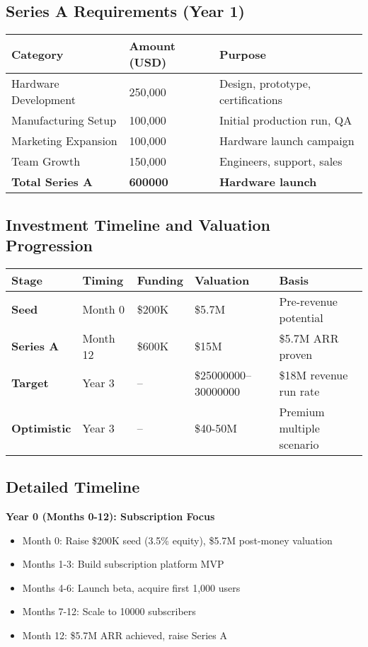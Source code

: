 \documentclass[11pt]{article}
\newcommand{\newSubsYearOne}{10000}
\newcommand{\seriesAAmount}{600000}
\newcommand{\seedEquity}{3.5}
\newcommand{\valuationRangeLow}{25000000}
\newcommand{\valuationRangeHigh}{30000000}
\begin{document}
\subsection{Series A Requirements (Year 1)}
\begin{table}[H]
\centering
\begin{tabularx}{\linewidth}{l Y Y}
\toprule
Category & Amount (USD) & Purpose \\\midrule
Hardware Development\cite{ycombinator2022} & 250,000 & Design, prototype, certifications \\
Manufacturing Setup & 100,000 & Initial production run, QA \\
Marketing Expansion & 100,000 & Hardware launch campaign \\
Team Growth & 150,000 & Engineers, support, sales \\
\textbf{Total Series A} & \textbf{\seriesAAmount} & \textbf{Hardware launch} \\
\bottomrule
\end{tabularx}
\end{table}

\subsection{Investment Timeline and Valuation Progression}
\begin{table}[H]
\centering
\begin{tabularx}{\linewidth}{l Y Y Y Y}
\toprule
Stage & Timing & Funding & Valuation & Basis \\\midrule
\textbf{Seed} & Month 0 & \$200K & \$5.7M & Pre-revenue potential \\
\textbf{Series A} & Month 12 & \$600K & \$15M & \$5.7M ARR proven \\
\textbf{Target} & Year 3 & -- & \$\num{\valuationRangeLow}--\num{\valuationRangeHigh} & \$18M revenue run rate \\
\textbf{Optimistic} & Year 3 & -- & \$40-50M & Premium multiple scenario \\
\bottomrule
\end{tabularx}
\end{table}

\subsection{Detailed Timeline}

\textbf{Year 0 (Months 0-12): Subscription Focus}
\begin{itemize}
  \item Month 0: Raise \$200K seed (\seedEquity\% equity), \$5.7M post-money valuation
  \item Months 1-3: Build subscription platform MVP
  \item Months 4-6: Launch beta, acquire first 1,000 users
  \item Months 7-12: Scale to \newSubsYearOne{} subscribers
  \item Month 12: \$5.7M ARR achieved, raise Series A
\end{itemize}
\end{document}

